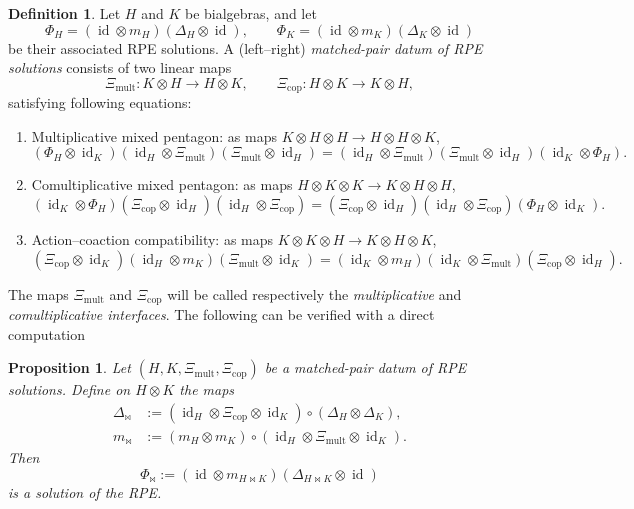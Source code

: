 \documentclass[a4paper,10pt]{amsart}
\newtheorem{proposition}[lemma]{Proposition}
\theoremstyle{definition}
\newtheorem{definition}[lemma]{Definition}
\theoremstyle{remark}
\DeclareMathOperator{\id}{id}
\newcommand\ot{\otimes}
\begin{document}
\begin{definition}\label{def:mp_davydov}
Let $H$ and $K$ be bialgebras, and let 
\[
\Phi_H=(\id\otimes m_H)(\Delta_H\otimes\id),
\qquad
\Phi_K=(\id\otimes m_K)(\Delta_K\otimes\id)
\]
be their associated RPE solutions. A (left--right)\emph{ matched-pair datum of RPE solutions} consists of two linear maps
\[
\Xi_{\mathrm{mult}}:K\otimes H\to H\otimes K,
\qquad
\Xi_{\mathrm{cop}}:H\otimes K\to K\otimes H,
\]
satisfying following equations: 
\begin{enumerate}
\item Multiplicative mixed pentagon:
as maps $K\otimes H\otimes H\to H\otimes H\otimes K$,
\[
(\Phi_H\otimes \id_K)
(\id_H\otimes \Xi_{\mathrm{mult}})
(\Xi_{\mathrm{mult}}\otimes \id_H)
=
(\id_H\otimes \Xi_{\mathrm{mult}})
(\Xi_{\mathrm{mult}}\otimes \id_H)
(\id_K\otimes \Phi_H).
\]

\item Comultiplicative mixed pentagon:
as maps $H\otimes K\otimes K\to K\otimes H\otimes H$,
\[
(\id_K\otimes \Phi_H)
(\Xi_{\mathrm{cop}}\otimes \id_H)
(\id_H\otimes \Xi_{\mathrm{cop}})
=
(\Xi_{\mathrm{cop}}\otimes \id_H)
(\id_H\otimes \Xi_{\mathrm{cop}})
(\Phi_H\otimes \id_K).
\]

\item Action--coaction compatibility: 
as maps $K\otimes K\otimes H\to K\otimes H\otimes K$,
\[
(\Xi_{\mathrm{cop}}\otimes \id_K)
(\id_H\otimes m_K)
(\Xi_{\mathrm{mult}}\otimes \id_K)
=
(\id_K\otimes m_H)
(\id_K\otimes \Xi_{\mathrm{mult}})
(\Xi_{\mathrm{cop}}\otimes \id_H).
\]
\end{enumerate}
\end{definition}

The maps $\Xi_{\mathrm{mult}}$ and $\Xi_{\mathrm{cop}}$ will be called respectively the \emph{multiplicative} and \emph{comultiplicative interfaces}. The following can be verified with a direct computation

\begin{proposition}\label{thm:matched_construction}
Let $(H,K,\Xi_{\mathrm{mult}},\Xi_{\mathrm{cop}})$ be a matched-pair datum of RPE solutions. Define on $H \ot K$ the maps 
\begin{align*}
\Delta_{\bowtie }
&:=
(\id_H\otimes \Xi_{\mathrm{cop}}\otimes \id_K)
\circ
(\Delta_H\otimes \Delta_K),\\[2mm]
m_{\bowtie }
&:=
(m_H\otimes m_K)
\circ
(\id_H\otimes \Xi_{\mathrm{mult}}\otimes \id_K).
\end{align*}
Then 
\[
\Phi_{\bowtie }
:=
(\id\otimes m_{H\bowtie K})
(\Delta_{H\bowtie K}\otimes \id)
\]
is a solution of the RPE.
\end{proposition}
\end{document}
